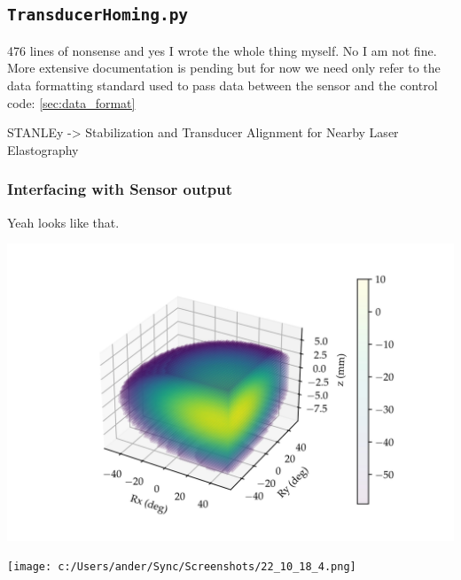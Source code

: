 \documentclass[11pt]{article}
\begin{document}
\subsection{\texttt{TransducerHoming.py}}\label{sec:TransducerHoming}
476 lines of nonsense and yes I wrote the whole thing myself. No I am not fine. More extensive documentation is pending but for now we need only refer to the data formatting standard used to pass data between the sensor and the control code: \autoref{sec:data_format}

STANLEy -> Stabilization and Transducer Alignment for Nearby Laser Elastography

\subsubsection{Interfacing with Sensor output}\label{sec:data_format}

\begin{center}
\end{center}
Yeah looks like that.
\begin{center}
    \includegraphics[width=.9\linewidth]{../Debugging Scripts/figures/fullscan_render_test_4.jpg}
\end{center}

\begin{center}
    \texttt{[image: c:/Users/ander/Sync/Screenshots/22\_10\_18\_4.png]}
\end{center}
\end{document}
